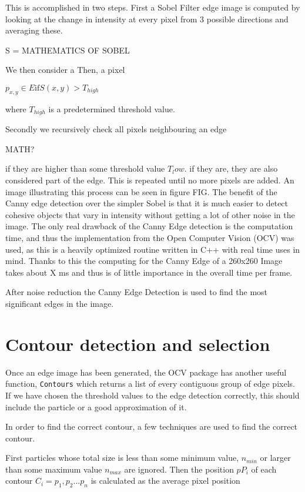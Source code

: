 \documentclass[]{report}
\begin{document}
This is accomplished in two steps. First a Sobel Filter edge image is computed by looking at the change in intensity at every pixel from 3 possible directions and averaging these. 

S = MATHEMATICS OF SOBEL

We then consider a Then, a pixel 

$p_{x,y} \in E \text{if} S(x,y) > T_{high}$

where $T_{high}$ is a predetermined threshold value. 

Secondly we recursively check all pixels neighbouring an edge

MATH?

 if they are higher than some threshold value $T_low$. if they are, they are also considered part of the edge. This is repeated until no more pixels are added. An image illustrating this process can be seen in figure FIG. The benefit of the Canny edge detection over the simpler Sobel is that it is much easier to detect cohesive objects that vary in intensity without getting a lot of other noise in the image. The only real drawback of the Canny Edge detection is the computation time, and thus the implementation from the Open Computer Vision (OCV) was used, as this is a heavily optimized routine written in C++ with real time uses in mind. Thanks to this the computing for the Canny Edge of a 260x260 Image takes about X ms and thus is of little importance in the overall time per frame.

After noise reduction the Canny Edge Detection is used to find the most significant edges in the image. 

\section{Contour detection and selection}

Once an edge image has been generated, the OCV package has another useful function, \texttt{Contours} which returns a list of every contiguous group of edge pixels. If we have chosen the threshold values to the edge detection correctly, this should include the particle or a good approximation of it. 

In order to find the correct contour, a few techniques are used to find the correct contour.

First particles whose total size is less than some minimum value, $ n_{min}$ or larger than some maximum value $n_{max}$ are ignored. Then the position $pP_i$ of each contour $C_i={p_1,p_2...p_n}$ is calculated as the average pixel position
\end{document}
